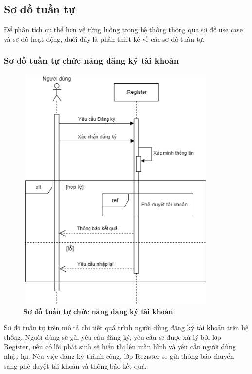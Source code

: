 \subsection{Sơ đồ tuần tự}
Để phân tích cụ thể hơn về từng luồng trong hệ thống thông qua sơ đồ use case và sơ đồ hoạt động, dưới đây là phần thiết kế
 về các sơ đồ tuần tự.

\subsubsection{Sơ đồ tuần tự chức năng đăng ký tài khoản}
\begin{figure}[H]
  \centering
  \includegraphics[width=10cm,height=12.5cm]{Images/sequence/sequence_register.png}
  \caption[Sơ đồ tuần tự chức năng đăng ký tài khoản]{\bfseries \fontsize{12pt}{0pt}
  \selectfont Sơ đồ tuần tự chức năng đăng ký tài khoản}
  \label{sequence_register} %
\end{figure}
Sơ đồ tuần tự trên mô tả chi tiết quá trình người dùng đăng ký tài khoản trên hệ thống. Người dùng sẽ gửi yêu cầu đăng ký, yêu cầu sẽ được xử lý
bởi lớp Register, nếu có lỗi phát sinh sẽ hiển thị lên màn hình và yêu cầu người dùng nhập lại. Nếu việc đăng ký thành công, lớp Register sẽ gửi thông báo 
chuyển sang phê duyệt tài khoản và thông báo kết quả.  

